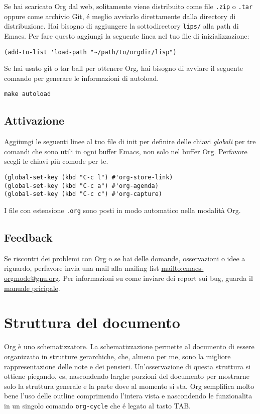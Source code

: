 \documentclass[11pt]{article}
\begin{document}
Se hai scaricato Org dal web, solitamente viene distribuito come file \texttt{.zip}
o \texttt{.tar} oppure come archivio Git, é meglio avviarlo direttamente dalla
directory di distribuzione. Hai bisogno di aggiungere la sottodirectory
\texttt{lips/} alla path di Emacs. Per fare questo aggiungi la seguente linea nel
tuo file di inizializzazione:

\begin{verbatim}
(add-to-list 'load-path "~/path/to/orgdir/lisp")
\end{verbatim}


Se hai usato git o tar ball per ottenere Org, hai bisogno di avviare il
seguente comando per generare le informazioni di autoload.

\begin{verbatim}
make autoload
\end{verbatim}

\subsection*{Attivazione}
\label{sec:org316fc0b}
Aggiiungi le seguenti linee al tuo file di init per definire delle chiavi
\emph{globali} per tre comandi che sono utili in ogni buffer Emacs, non solo nel
buffer Org. Perfavore scegli le chiavi più comode per te.

\begin{verbatim}
(global-set-key (kbd "C-c l") #'org-store-link)
(global-set-key (kbd "C-c a") #'org-agenda)
(global-set-key (kbd "C-c c") #'org-capture)
\end{verbatim}

I file con estensione \texttt{.org} sono posti in modo automatico nella modalità
Org.

\subsection*{Feedback}
\label{sec:orgdc26732}
Se riscontri dei problemi con Org o se hai delle domande, osservazioni o
idee a riguardo, perfavore invia una mail alla mailing list
\url{mailto:emacs-orgmode@gnu.org}.  Per informazioni su come inviare dei report
sui bug, guarda il \href{org}{manuale pricipale}.

\section{Struttura del documento}
\label{sec:orga976bef}
Org è uno schematizzatore. La schematizzazione permette al documento di
essere organizzato in strutture gerarchiche, che, almeno per me, sono la
migliore rappresentazione delle note e dei pensieri. Un'osservazione di
questa struttura si ottiene piegando, es, nascondendo larghe porzioni del
documento per mostrarne solo la struttura generale e la parte dove al
momento si sta. Org semplifica molto bene l'uso delle outline comprimendo
l'intera vista e nascondendo le funzionalita in un singolo comando
\texttt{org-cycle} che é legato al tasto TAB.
\end{document}
